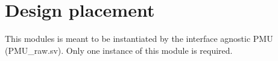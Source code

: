 \section{Design placement}
\label{chapter2}
This modules is meant to be instantiated by the interface agnostic PMU (PMU\_raw.sv). Only one instance of this module is required.




